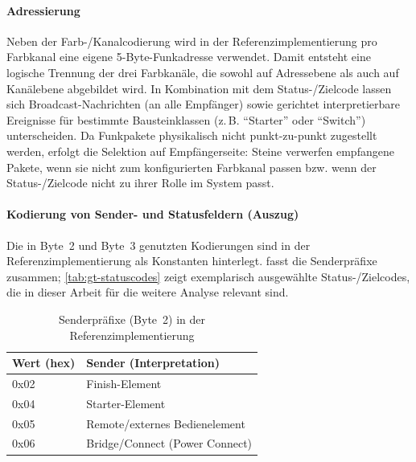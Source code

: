 \paragraph{Adressierung}
Neben der Farb-/Kanalcodierung wird in der Referenzimplementierung pro Farbkanal eine eigene 5-Byte-Funkadresse verwendet.
Damit entsteht eine logische Trennung der drei Farbkanäle, die sowohl auf Adressebene als auch auf Kanälebene abgebildet wird.
In Kombination mit dem Status-/Zielcode lassen sich Broadcast-Nachrichten (an alle Empfänger) sowie gerichtet interpretierbare Ereignisse für bestimmte Bausteinklassen (z.\,B. \enquote{Starter} oder \enquote{Switch}) unterscheiden.
Da Funkpakete physikalisch nicht punkt-zu-punkt zugestellt werden, erfolgt die Selektion auf Empfängerseite: Steine verwerfen empfangene Pakete, wenn sie nicht zum konfigurierten Farbkanal passen bzw. wenn der Status-/Zielcode nicht zu ihrer Rolle im System passt.

\paragraph{Kodierung von Sender- und Statusfeldern (Auszug)}
Die in Byte~2 und Byte~3 genutzten Kodierungen sind in der Referenzimplementierung als Konstanten hinterlegt.
 fasst die Senderpräfixe zusammen; \cref{tab:gt-statuscodes} zeigt exemplarisch ausgewählte Status-/Zielcodes, die in dieser Arbeit für die weitere Analyse relevant sind.

\begin{table}[ht]
\centering
\begin{tabular}{@{}l l@{}}
\toprule
\textbf{Wert (hex)} & \textbf{Sender (Interpretation)} \\
\midrule
0x02 & Finish-Element \\
0x04 & Starter-Element \\
0x05 & Remote/externes Bedienelement \\
0x06 & Bridge/Connect (Power Connect) \\
\bottomrule
\end{tabular}
\caption{Senderpräfixe (Byte~2) in der Referenzimplementierung}
\label{tab:gt-senderpraefix}
\end{table}

